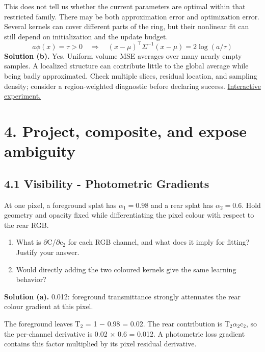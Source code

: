 \documentclass[11pt,a4paper]{article}
\begin{document}
This does not tell us whether the current parameters are optimal within that restricted family.
There may be both approximation error and optimization error.
Several kernels can cover different parts of the ring, but their nonlinear fit can still depend on initialization and the update budget.
\[
a\phi(x)=\tau>0\quad\Longrightarrow\quad(x-\mu)^\top\Sigma^{-1}(x-\mu)=2\log(a/\tau)
\]
\noindent\textbf{Solution (b).} Yes.
Uniform volume MSE averages over many nearly empty samples.
A localized structure can contribute little to the global average while being badly approximated.
Check multiple slices, residual location, and sampling density; consider a region-weighted diagnostic before declaring success.
\noindent\href{https://sosekie.github.io/Unibe-CVG-CV-Interactive-Labs/tutorial-09/#parameters}{Interactive experiment.}
\par{}\section*{4. Project, composite, and expose ambiguity}
\subsection*{4.1 Visibility - Photometric Gradients}
At one pixel, a foreground splat has $\alpha_1=0.98$ and a rear splat has $\alpha_2=0.6$.
Hold geometry and opacity fixed while differentiating the pixel colour with respect to the rear RGB.
\begin{enumerate}[label=(\alph*),nosep]
\item What is $\partial$C/$\partial$c${}_2$ for each RGB channel, and what does it imply for fitting?
Justify your answer.
\item Would directly adding the two coloured kernels give the same learning behavior?
\end{enumerate}
\noindent\textbf{Solution (a).} 0.012: foreground transmittance strongly attenuates the rear colour gradient at this pixel.

The foreground leaves T${}_2$ = 1 $-$ 0.98 = 0.02.
The rear contribution is T${}_2$$\alpha$${}_2$c${}_2$, so the per-channel derivative is 0.02 $\times$ 0.6 = 0.012.
A photometric loss gradient contains this factor multiplied by its pixel residual derivative.
\end{document}
